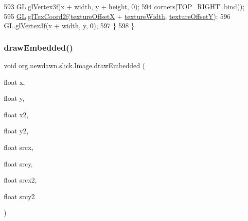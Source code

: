 \begin{DoxyCode}
593             \mbox{\hyperlink{classorg_1_1newdawn_1_1slick_1_1_image_aafbab31355bec79e747f477e970dcda4}{GL}}.\mbox{\hyperlink{interfaceorg_1_1newdawn_1_1slick_1_1opengl_1_1renderer_1_1_s_g_l_ae2baba1598d723f9059f45e0871be822}{glVertex3f}}(x + \mbox{\hyperlink{classorg_1_1newdawn_1_1slick_1_1_image_a7d02c85e21b388428cfe5cc5c82714a1}{width}}, y + \mbox{\hyperlink{classorg_1_1newdawn_1_1slick_1_1_image_a54397a37823bc59ddc79ec70dc5cf226}{height}}, 0);
594             \mbox{\hyperlink{classorg_1_1newdawn_1_1slick_1_1_image_a3b6e6a11b3d871cf5677a561b19d9131}{corners}}[\mbox{\hyperlink{classorg_1_1newdawn_1_1slick_1_1_image_ac5558f891b01ad616dbb32123f4a15a3}{TOP\_RIGHT}}].\mbox{\hyperlink{classorg_1_1newdawn_1_1slick_1_1_color_ae4b71c94854f7983f2ccdb7340438e23}{bind}}();
595             \mbox{\hyperlink{classorg_1_1newdawn_1_1slick_1_1_image_aafbab31355bec79e747f477e970dcda4}{GL}}.\mbox{\hyperlink{interfaceorg_1_1newdawn_1_1slick_1_1opengl_1_1renderer_1_1_s_g_l_a5f661318cf9926c586a9837d0ded9fbd}{glTexCoord2f}}(\mbox{\hyperlink{classorg_1_1newdawn_1_1slick_1_1_image_a0d11936067f8ad706c42a5feb411b5c8}{textureOffsetX}} + 
      \mbox{\hyperlink{classorg_1_1newdawn_1_1slick_1_1_image_a0beda6fc601023aff97cce0d20d81f1e}{textureWidth}}, \mbox{\hyperlink{classorg_1_1newdawn_1_1slick_1_1_image_a5c542a6d5fccbb7d56d74129b05cb78d}{textureOffsetY}});
596             \mbox{\hyperlink{classorg_1_1newdawn_1_1slick_1_1_image_aafbab31355bec79e747f477e970dcda4}{GL}}.\mbox{\hyperlink{interfaceorg_1_1newdawn_1_1slick_1_1opengl_1_1renderer_1_1_s_g_l_ae2baba1598d723f9059f45e0871be822}{glVertex3f}}(x + \mbox{\hyperlink{classorg_1_1newdawn_1_1slick_1_1_image_a7d02c85e21b388428cfe5cc5c82714a1}{width}}, y, 0);
597         \}
598     \}
\end{DoxyCode}
\mbox{\label{classorg_1_1newdawn_1_1slick_1_1_image_a7a401738f513cacb04ae9ef28c9ef856}} 
\subsubsection{\texorpdfstring{draw\+Embedded()}{drawEmbedded()}\hspace{0.1cm}{\footnotesize\ttfamily [2/3]}}
{\footnotesize\ttfamily void org.\+newdawn.\+slick.\+Image.\+draw\+Embedded (\begin{DoxyParamCaption}\item[{float}]{x,  }\item[{float}]{y,  }\item[{float}]{x2,  }\item[{float}]{y2,  }\item[{float}]{srcx,  }\item[{float}]{srcy,  }\item[{float}]{srcx2,  }\item[{float}]{srcy2 }\end{DoxyParamCaption})\hspace{0.3cm}{\ttfamily [inline]}}

